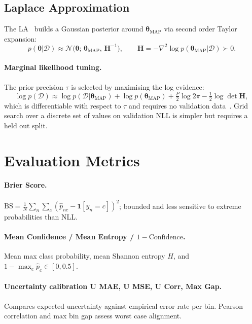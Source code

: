\documentclass[conference]{IEEEtran}
\newcommand{\btheta}{\bm{\theta}}
\newcommand{\cD}{\mathcal{D}}
\newcommand{\cN}{\mathcal{N}}
\newcommand{\MAP}{\text{MAP}}
\begin{document}
\subsection{Laplace Approximation}
\label{sec:theory:la}

The LA~\citep{daxberger2021laplace} builds a Gaussian posterior around
$\btheta_{\MAP}$ via second order Taylor expansion:
\begin{equation}
  p(\btheta|\cD) \approx \cN\!\bigl(\btheta;\,\btheta_{\MAP},\,\mathbf{H}^{-1}\bigr),
  \qquad
  \mathbf{H} = -\nabla^2\log p(\btheta_{\MAP}|\cD) \succ 0.
\end{equation}

\paragraph{Marginal likelihood tuning.}
The prior precision $\tau$ is selected by maximising the log evidence:
\begin{equation}
  \log p(\cD)
    \approx \log p(\cD|\btheta_{\MAP})
    + \log p(\btheta_{\MAP})
    + \tfrac{P}{2}\log 2\pi
    - \tfrac{1}{2}\log\det\mathbf{H},
  \label{eq:marglik}
\end{equation}
which is differentiable with respect to $\tau$ and requires no validation
data~\citep{daxberger2021laplace}. Grid search over
a discrete set of values on validation NLL is simpler but requires a
held out split.

\section{Evaluation Metrics}
\label{sec:metrics}

\paragraph{Brier Score.}
$\mathrm{BS}=\frac{1}{N}\sum_n\sum_c(\hat{p}_{nc}-\mathbf{1}[y_n=c])^2$;
bounded and less sensitive to extreme probabilities than NLL.

\paragraph{Mean Confidence / Mean Entropy / $1 - \text{Confidence}$.}
Mean max class probability, mean Shannon entropy $H$, and
$1-\max_c\hat{p}_c\in[0,0.5]$.

\paragraph{Uncertainty calibration U MAE, U MSE, U Corr, Max Gap.}
Compares expected uncertainty against empirical error rate
per bin. Pearson correlation and max bin gap assess worst case alignment.
\end{document}
